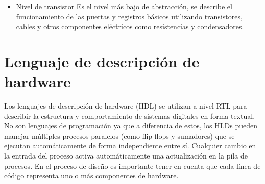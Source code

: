 \begin{itemize}
\item
Nivel de transistor
Es el nivel más bajo de abstracción, se describe el funcionamiento de las puertas y registros básicos utilizando transistores, cables y otros componentes eléctricos como resistencias y condensadores.

\end{itemize}



\section{Lenguaje de descripción de hardware}

Los lenguajes de descripción de hardware (HDL) se utilizan a nivel RTL para describir la estructura y comportamiento de sistemas digitales en forma textual. No son lenguajes de programación ya que a diferencia de estos, los HLDs pueden manejar múltiples procesos paralelos (como flip-flops y sumadores) que se ejecutan automáticamente de forma independiente entre sí. Cualquier cambio en la entrada del proceso activa automáticamente una actualización en la pila de procesos. En el proceso de diseño es importante tener en cuenta que cada línea de código representa uno o más componentes de hardware.
 

